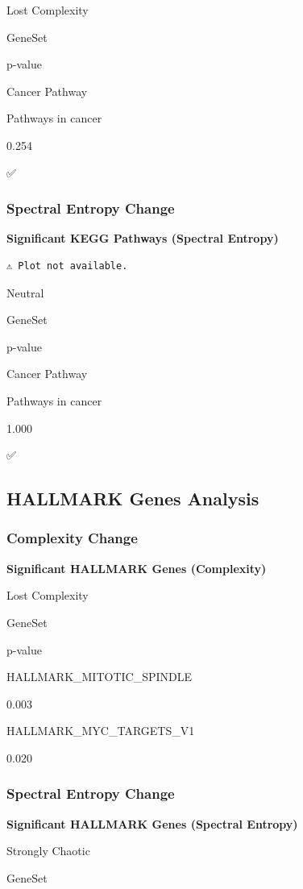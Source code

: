 \documentclass[
  letterpaper,
  DIV=11,
  numbers=noendperiod,
  openany,
  oneside]{scrreprt}
\begin{document}
Lost Complexity

GeneSet

p-value

Cancer Pathway

Pathways in cancer

0.254

✅

\subsubsection{Spectral Entropy Change}

\textbf{Significant KEGG Pathways (Spectral Entropy)}

\begin{verbatim}
⚠️ Plot not available.
\end{verbatim}

Neutral

GeneSet

p-value

Cancer Pathway

Pathways in cancer

1.000

✅

\subsection{HALLMARK Genes Analysis}

\subsubsection{Complexity Change}

\textbf{Significant HALLMARK Genes (Complexity)}

Lost Complexity

GeneSet

p-value

HALLMARK\_MITOTIC\_SPINDLE

0.003

HALLMARK\_MYC\_TARGETS\_V1

0.020

\subsubsection{Spectral Entropy Change}

\textbf{Significant HALLMARK Genes (Spectral Entropy)}

Strongly Chaotic

GeneSet
\end{document}
